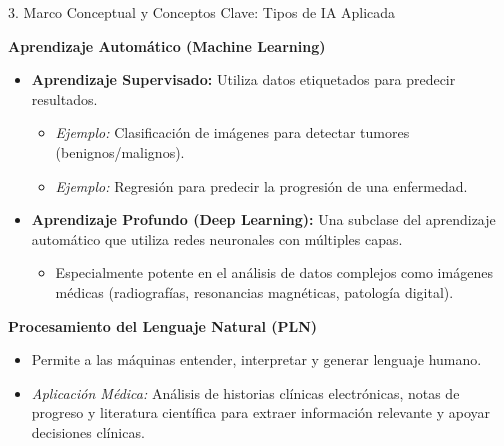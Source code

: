\documentclass[aspectratio=169]{beamer}
\begin{document}
\begin{frame}[fragile]{3. Marco Conceptual y Conceptos Clave: Tipos de IA Aplicada}


\textbf{Aprendizaje Automático (Machine Learning)}
\begin{itemize}
  \item \textbf{Aprendizaje Supervisado:} Utiliza datos etiquetados para predecir resultados.
  \begin{itemize}
    \item \textit{Ejemplo:} Clasificación de imágenes para detectar tumores (benignos/malignos).
    \item \textit{Ejemplo:} Regresión para predecir la progresión de una enfermedad.
  \end{itemize}
  \item \textbf{Aprendizaje Profundo (Deep Learning):} Una subclase del aprendizaje automático que utiliza redes neuronales con múltiples capas.
  \begin{itemize}
    \item Especialmente potente en el análisis de datos complejos como imágenes médicas (radiografías, resonancias magnéticas, patología digital).
  \end{itemize}
\end{itemize}
\textbf{Procesamiento del Lenguaje Natural (PLN)}
\begin{itemize}
  \item Permite a las máquinas entender, interpretar y generar lenguaje humano.
  \item \textit{Aplicación Médica:} Análisis de historias clínicas electrónicas, notas de progreso y literatura científica para extraer información relevante y apoyar decisiones clínicas.
\end{itemize}
\end{frame}
\end{document}
